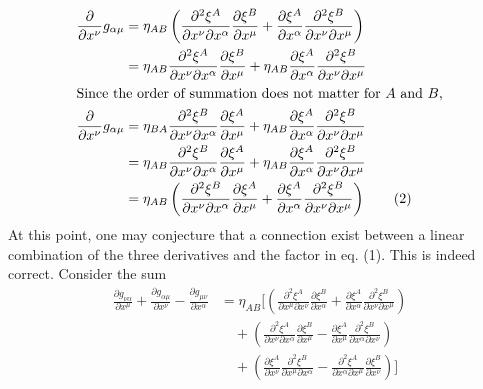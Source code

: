 \documentclass{article}
\begin{document}
\begin{align*}
\frac{\partial}{\partial x^\nu} g_{\alpha\mu} &= 
\eta_{AB} \left(\frac{\partial^2 \xi^A}{\partial x^\nu \partial x^\alpha} \frac{\partial \xi^B}{\partial x^\mu}
+ \frac{\partial \xi^A}{\partial x^\alpha} \frac{\partial^2 \xi^B}{\partial x^\nu \partial x^\mu}\right) \\
&= \eta_{AB} \frac{\partial^2 \xi^A}{\partial x^\nu \partial x^\alpha} \frac{\partial \xi^B}{\partial x^\mu}
+ \eta_{AB}\frac{\partial \xi^A}{\partial x^\alpha} \frac{\partial^2 \xi^B}{\partial x^\nu \partial x^\mu} \\
\intertext{Since the order of summation does not matter for $A$ and $B$,}
\frac{\partial}{\partial x^\nu} g_{\alpha\mu}
&= \eta_{BA} \frac{\partial^2 \xi^B}{\partial x^\nu \partial x^\alpha} \frac{\partial \xi^A}{\partial x^\mu}
+ \eta_{AB}\frac{\partial \xi^A}{\partial x^\alpha} \frac{\partial^2 \xi^B}{\partial x^\nu \partial x^\mu} \\
&= \eta_{AB} \frac{\partial^2 \xi^B}{\partial x^\nu \partial x^\alpha} \frac{\partial \xi^A}{\partial x^\mu}
+ \eta_{AB}\frac{\partial \xi^A}{\partial x^\alpha} \frac{\partial^2 \xi^B}{\partial x^\nu \partial x^\mu} \\
&= \eta_{AB} \left(\frac{\partial^2 \xi^B}{\partial x^\nu \partial x^\alpha} \frac{\partial \xi^A}{\partial x^\mu}
+ \frac{\partial \xi^A}{\partial x^\alpha} \frac{\partial^2 \xi^B}{\partial x^\nu \partial x^\mu}\right)
\tag{2}
\end{align*}
At this point, one may conjecture that a connection exist between a
linear combination of the three derivatives and the factor in eq. (1). This is 
indeed correct. Consider the sum
\begin{align*}
\frac{\partial g_{\nu\alpha}}{\partial x^\mu}
+ \frac{\partial g_{\alpha\mu}}{\partial x^\nu}
- \frac{\partial g_{\mu\nu}}{\partial x^\alpha}
&= \eta_{AB} \Bigg[
    \left(
        \frac{\partial^2 \xi^A}{\partial x^\mu \partial x^\nu}
        \frac{\partial \xi^B}{\partial x^\alpha}
        +
        \frac{\partial \xi^A}{\partial x^\alpha}
        \frac{\partial^2 \xi^B}{\partial x^\nu \partial x^\mu}
    \right) \\
&\quad +
    \left(
        \frac{\partial^2 \xi^A}{\partial x^\nu \partial x^\alpha}
        \frac{\partial \xi^B}{\partial x^\mu}
        -
        \frac{\partial \xi^A}{\partial x^\mu}
        \frac{\partial^2 \xi^B}{\partial x^\alpha \partial x^\nu}
    \right) \\
&\quad +
    \left(
        \frac{\partial \xi^A}{\partial x^\nu}
        \frac{\partial^2 \xi^B}{\partial x^\mu \partial x^\alpha}
        -
        \frac{\partial^2 \xi^A}{\partial x^\alpha \partial x^\mu}
        \frac{\partial \xi^B}{\partial x^\nu}
    \right)
\Bigg]
\end{align*}
\end{document}

